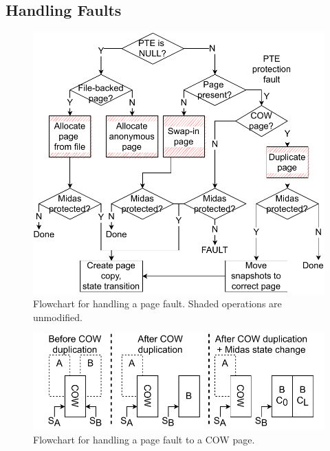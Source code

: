 \subsection{Handling Faults}

\begin{figure}[]
  \centering
  \includegraphics[scale=0.85]{media/midas/pagefault.pdf}
  \caption[\midas{}: Flowchart for handling a page fault.]
          {Flowchart for handling a page fault. Shaded
          operations are unmodified.}
  \label{fig:midas:fault_handling}
\end{figure}

\begin{figure}[]
  \centering
  \includegraphics[scale=0.85]{media/midas/pagefault_cow.pdf}
  \caption[\midas: Flowchart for handling a page fault to a COW page.]
          {Flowchart for handling a page fault to a COW page.}
  \label{fig:midas:fault_handling_cow}
\end{figure}


